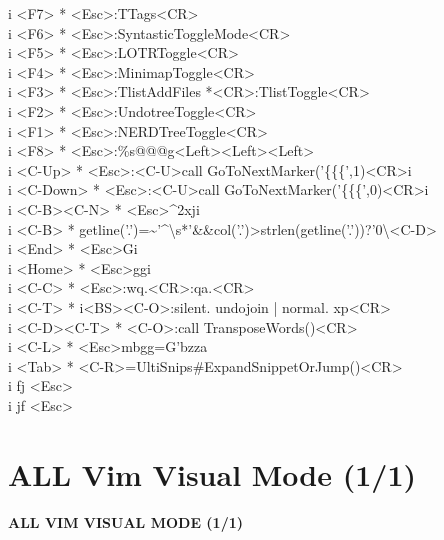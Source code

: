 \documentclass[11pt,a4paper,twoside]{book}
\begin{document}
i  <F7>  * <Esc>:TTags<CR>\\
i  <F6>  * <Esc>:SyntasticToggleMode<CR>\\
i  <F5>  * <Esc>:LOTRToggle<CR>\\
i  <F4>  * <Esc>:MinimapToggle<CR>\\
i  <F3>  * <Esc>:TlistAddFiles *<CR>:TlistToggle<CR>\\
i  <F2>  * <Esc>:UndotreeToggle<CR>\\
i  <F1>  * <Esc>:NERDTreeToggle<CR>\\
i  <F8>  * <Esc>:\%s@@@g<Left><Left><Left>\\
i  <C-Up>  * <Esc>:<C-U>call GoToNextMarker('\{\{\{',1)<CR>i\\
i  <C-Down>  * <Esc>:<C-U>call GoToNextMarker('\{\{\{',0)<CR>i\\
i  <C-B><C-N>  * <Esc>\textasciicircum{}2xji\\
i  <C-B>  * getline('.')=\textasciitilde{}'\textasciicircum{}\textbackslash{}s*'\&\&col('.')>strlen(getline('.'))?'0\textbackslash{}<C-D>\\
i  <End>  * <Esc>Gi\\
i  <Home>  * <Esc>ggi\\
i  <C-C>  * <Esc>:wq.<CR>:qa.<CR>\\
i  <C-T>  * i<BS><C-O>:silent. undojoin | normal. xp<CR>\\
i  <C-D><C-T>  * <C-O>:call TransposeWords()<CR>\\
i  <C-L>  * <Esc>mbgg=G'bzza\\
i  <Tab>  * <C-R>=UltiSnips\#ExpandSnippetOrJump()<CR>\\
i  fj  <Esc>\\
i  jf  <Esc>\\


\vspace{16pt}

\section{ALL Vim Visual Mode (1/1)}


\vspace{10pt}
{\large\bfseries\color{neoncyan} ALL VIM VISUAL MODE (1/1)}\vspace{6pt}
\end{document}
